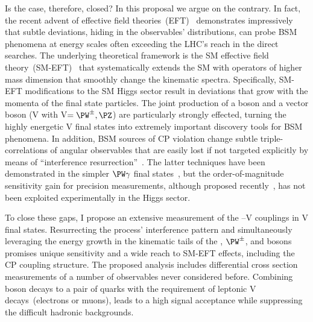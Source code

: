 \documentclass[a4paper,11pt]{article}
\newcommand{\Pb}{{{\Pqb}}\xspace}
\renewcommand{\PV}{{{{V}}}\xspace}
\newcommand{\VH}{{{\PV}{\PH}}\xspace}
\begin{document}
Is the case, therefore, closed? 
In this proposal we argue on the contrary. In fact, the recent advent of effective field theories~(EFT)~\cite{Grinstein:1991cd,Chiu:2007dg,Passarino:2016pzb} demonstrates impressively that subtle deviations, hiding in the observables' distributions, can probe BSM phenomena at energy scales often exceeding the LHC's reach in the direct searches. 
The underlying theoretical framework is the SM effective field theory~(SM-EFT)~\cite{Jenkins:2013zja,Alonso:2013hga,Jenkins:2013wua,Englert:2014cva,Brivio:2017vri} that systematically extends the SM with operators of higher mass dimension that smoothly change the kinematic spectra.
Specifically,  SM-EFT modifications to the SM Higgs sector result in deviations that grow with the momenta of the final state particles. 
The joint production of a \PH boson and a vector boson (\VH with \PV$=\PW^{\pm},\PZ$) are particularly strongly effected, turning the highly energetic \VH final states into extremely important discovery tools for BSM phenomena. 
In addition, BSM sources of CP violation change subtle triple-correlations of angular observables that are easily lost if not targeted explicitly by means of ``interference resurrection''~\cite{Panico:2017frx}.
The latter techniques have been demonstrated in the simpler $\PW\gamma$ final states~\cite{CMS-PAS-SMP-20-005}, but the order-of-magnitude sensitivity gain for precision measurements, although proposed recently~\cite{Banerjee:2019twi}, has not been exploited experimentally in the Higgs sector. 

To close these gaps, I propose an extensive measurement of the \PH--\PV couplings in \VH final states. Resurrecting the process' interference pattern and simultaneously leveraging the energy growth in the kinematic tails of the \PH, $\PW^{\pm}$, and \PZ bosons promises unique sensitivity and a wide reach to SM-EFT effects, including the CP coupling structure.
The proposed analysis includes differential cross section measurements of a number of observables never considered before.
Combining \PH boson decays to a pair of \Pb quarks with the requirement of leptonic \PV decays~(electrons or muons), leads to a high signal acceptance while suppressing the difficult hadronic backgrounds.  
\end{document}
